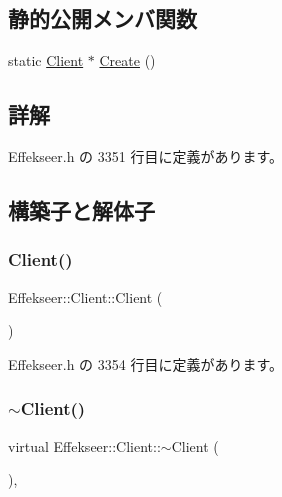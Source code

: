 \subsection*{静的公開メンバ関数}
\begin{DoxyCompactItemize}
\item 
static \mbox{\hyperlink{class_effekseer_1_1_client}{Client}} $\ast$ \mbox{\hyperlink{class_effekseer_1_1_client_a817c27febbb77053bd90ffa866d3ed9f}{Create}} ()
\end{DoxyCompactItemize}


\subsection{詳解}


 Effekseer.\+h の 3351 行目に定義があります。



\subsection{構築子と解体子}
\mbox{\label{class_effekseer_1_1_client_a42b5bd5ae18884b4c884f94173c6e1e2}} 
\subsubsection{\texorpdfstring{Client()}{Client()}}
{\footnotesize\ttfamily Effekseer\+::\+Client\+::\+Client (\begin{DoxyParamCaption}{ }\end{DoxyParamCaption})\hspace{0.3cm}{\ttfamily [inline]}}



 Effekseer.\+h の 3354 行目に定義があります。

\mbox{\label{class_effekseer_1_1_client_a77d6c51135b4e3b69b75bff309bb0a85}} 
\subsubsection{\texorpdfstring{$\sim$\+Client()}{~Client()}}
{\footnotesize\ttfamily virtual Effekseer\+::\+Client\+::$\sim$\+Client (\begin{DoxyParamCaption}{ }\end{DoxyParamCaption})\hspace{0.3cm}{\ttfamily [inline]}, {\ttfamily [virtual]}}



